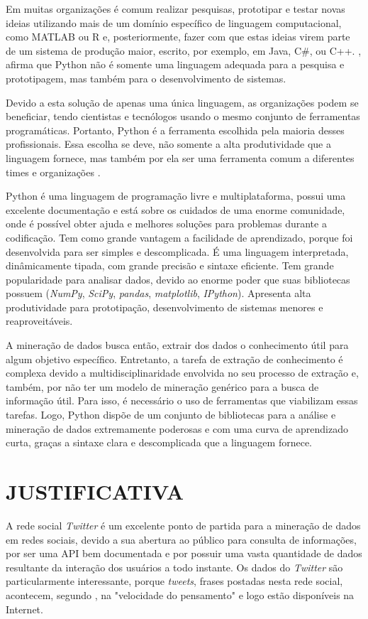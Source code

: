 Em muitas organizações é comum realizar pesquisas, prototipar e testar novas ideias utilizando mais de um domínio específico de linguagem computacional, como MATLAB ou R e, posteriormente, fazer com que estas ideias virem parte de um sistema de produção maior, escrito, por exemplo, em Java, C\#, ou C++. , afirma que Python não é somente uma linguagem adequada para a pesquisa e prototipagem, mas também para o desenvolvimento de sistemas.

Devido a esta solução de apenas uma única linguagem, as organizações podem se beneficiar, tendo cientistas e tecnólogos usando o mesmo conjunto de ferramentas programáticas. Portanto, Python é a ferramenta escolhida pela maioria desses profissionais. Essa escolha se deve, não somente a alta produtividade que a linguagem fornece, mas também por ela ser uma ferramenta comum a diferentes times e organizações \cite{kaldero}. 

Python é uma linguagem de programação livre e multiplataforma, possui uma excelente documentação e está sobre os cuidados de uma enorme comunidade, onde é possível obter ajuda e melhores soluções para problemas durante a codificação. Tem como grande vantagem a facilidade de aprendizado, porque foi desenvolvida para ser simples e descomplicada. É uma linguagem interpretada, dinâmicamente tipada, com grande precisão e sintaxe eficiente. Tem grande popularidade para analisar dados, devido ao enorme poder que suas bibliotecas possuem (\textit{NumPy}, \textit{SciPy}, \textit{pandas}, \textit{matplotlib}, \textit{IPython}). Apresenta alta produtividade para prototipação, desenvolvimento de sistemas menores e reaproveitáveis.

A mineração de dados busca então, extrair dos dados o conhecimento útil para algum objetivo específico. Entretanto, a tarefa de extração de conhecimento é complexa devido a multidisciplinaridade envolvida no seu processo de extração e, também, por não ter um modelo de mineração genérico para a busca de informação útil. Para isso, é necessário o uso de ferramentas que viabilizam essas tarefas. Logo, Python dispõe de um conjunto de bibliotecas para a análise e mineração de dados extremamente poderosas e com uma curva de aprendizado curta, graças a sintaxe clara e descomplicada que a linguagem fornece.


\section{JUSTIFICATIVA}\label{sec:justificativa}
A rede social \textit{Twitter} é um excelente ponto de partida para a mineração de dados em redes sociais, devido a sua abertura ao público para consulta de informações, por ser uma API bem documentada e por possuir uma vasta quantidade de dados resultante da interação dos usuários a todo instante. Os dados do \textit{Twitter} são particularmente interessante, porque \textit{tweets}, frases postadas nesta rede social, acontecem, segundo , na "velocidade do pensamento" \space e logo estão disponíveis na Internet.

